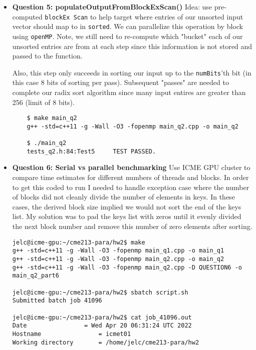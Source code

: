 \documentclass[12pt,letterpaper,twoside]{article}
\begin{document}
\begin{itemize}
    \item \textbf{Question 5: populateOutputFromBlockExScan()} Idea: use pre-computed
    \texttt{blockEx Scan} to help target where entries of our unsorted input vector
    should map to in \texttt{sorted}. We can parallelize this operation by block using 
    \texttt{openMP}. Note, we still need to re-compute which "bucket" each of our unsorted 
    entries are from at each step since this information is not stored and passed to the 
    function. 
    
    Also, this step only succeeds in sorting our input up to the \texttt{numBits}'th 
    bit (in this case 8 bits of sorting per pass). Subsequent "passes" are needed to complete
    our radix sort algorithm since many input entires are greater than 256 (limit of 8 bits).

    \begin{verbatim}
    $ make main_q2
    g++ -std=c++11 -g -Wall -O3 -fopenmp main_q2.cpp -o main_q2

    $ ./main_q2
    tests_q2.h:84:Test5     TEST PASSED.
    \end{verbatim}

    \item \textbf{Question 6: Serial vs parallel benchmarking} Use ICME GPU cluster to 
    compare time estimates for different numbers of threads and blocks. In order to get 
    this coded to run I needed to handle exception case where the number of blocks did 
    not cleanly divide the number of elements in keys. In these cases, the derived block 
    size implied we would not sort the end of the keys list. My solution was to pad the 
    keys list with zeros until it evenly divided the next block number and remove this 
    number of zero elements after sorting.

\begin{verbatim}
jelc@icme-gpu:~/cme213-para/hw2$ make
g++ -std=c++11 -g -Wall -O3 -fopenmp main_q1.cpp -o main_q1
g++ -std=c++11 -g -Wall -O3 -fopenmp main_q2.cpp -o main_q2
g++ -std=c++11 -g -Wall -O3 -fopenmp main_q2.cpp -D QUESTION6 -o main_q2_part6

jelc@icme-gpu:~/cme213-para/hw2$ sbatch script.sh 
Submitted batch job 41096

jelc@icme-gpu:~/cme213-para/hw2$ cat job_41096.out 
Date				= Wed Apr 20 06:31:24 UTC 2022
Hostname				= icmet01
Working directory 		= /home/jelc/cme213-para/hw2


\end{verbatim}
\end{itemize}
\end{document}

